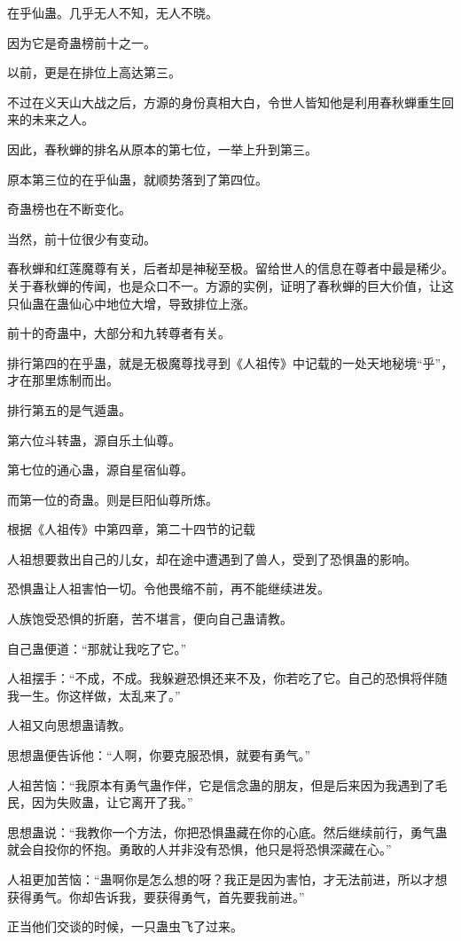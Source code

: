 \begin{this_body}
在乎仙蛊。几乎无人不知，无人不晓。

因为它是奇蛊榜前十之一。

以前，更是在排位上高达第三。

不过在义天山大战之后，方源的身份真相大白，令世人皆知他是利用春秋蝉重生回来的未来之人。

因此，春秋蝉的排名从原本的第七位，一举上升到第三。

原本第三位的在乎仙蛊，就顺势落到了第四位。

奇蛊榜也在不断变化。

当然，前十位很少有变动。

春秋蝉和红莲魔尊有关，后者却是神秘至极。留给世人的信息在尊者中最是稀少。关于春秋蝉的传闻，也是众口不一。方源的实例，证明了春秋蝉的巨大价值，让这只仙蛊在蛊仙心中地位大增，导致排位上涨。

前十的奇蛊中，大部分和九转尊者有关。

排行第四的在乎蛊，就是无极魔尊找寻到《人祖传》中记载的一处天地秘境“乎”，才在那里炼制而出。

排行第五的是气遁蛊。

第六位斗转蛊，源自乐土仙尊。

第七位的通心蛊，源自星宿仙尊。

而第一位的奇蛊。则是巨阳仙尊所炼。

根据《人祖传》中第四章，第二十四节的记载

人祖想要救出自己的儿女，却在途中遭遇到了兽人，受到了恐惧蛊的影响。

恐惧蛊让人祖害怕一切。令他畏缩不前，再不能继续进发。

人族饱受恐惧的折磨，苦不堪言，便向自己蛊请教。

自己蛊便道：“那就让我吃了它。”

人祖摆手：“不成，不成。我躲避恐惧还来不及，你若吃了它。自己的恐惧将伴随我一生。你这样做，太乱来了。”

人祖又向思想蛊请教。

思想蛊便告诉他：“人啊，你要克服恐惧，就要有勇气。”

人祖苦恼：“我原本有勇气蛊作伴，它是信念蛊的朋友，但是后来因为我遇到了毛民，因为失败蛊，让它离开了我。”

思想蛊说：“我教你一个方法，你把恐惧蛊藏在你的心底。然后继续前行，勇气蛊就会自投你的怀抱。勇敢的人并非没有恐惧，他只是将恐惧深藏在心。”

人祖更加苦恼：“蛊啊你是怎么想的呀？我正是因为害怕，才无法前进，所以才想获得勇气。你却告诉我，要获得勇气，首先要我前进。”

正当他们交谈的时候，一只蛊虫飞了过来。


\end{this_body}

